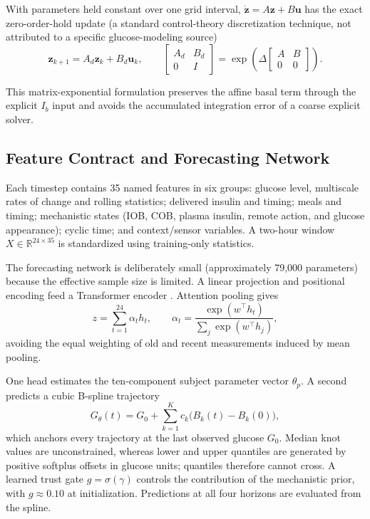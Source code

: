 \documentclass[journal]{IEEEtran}
\begin{document}
With parameters held constant over one grid interval, $\dot{\mathbf{z}} = A\mathbf{z} + B\mathbf{u}$ has the exact zero-order-hold update (a standard control-theory discretization technique, not attributed to a specific glucose-modeling source)
\begin{equation}
\mathbf{z}_{k+1} = A_d \mathbf{z}_k + B_d \mathbf{u}_k, \qquad
\begin{bmatrix} A_d & B_d \\ 0 & I \end{bmatrix} = \exp\!\left(\Delta \begin{bmatrix} A & B \\ 0 & 0 \end{bmatrix}\right).
\label{eq:13}
\end{equation}

This matrix-exponential formulation preserves the affine basal term through the explicit $I_b$ input and avoids the accumulated integration error of a coarse explicit solver.

\subsection{Feature Contract and Forecasting Network}

Each timestep contains 35 named features in six groups: glucose level, multiscale rates of change and rolling statistics; delivered insulin and timing; meals and timing; mechanistic states (IOB, COB, plasma insulin, remote action, and glucose appearance); cyclic time; and context/sensor variables. A two-hour window $X \in \mathbb{R}^{24 \times 35}$ is standardized using training-only statistics.

The forecasting network is deliberately small (approximately 79,000 parameters) because the effective sample size is limited. A linear projection and positional encoding feed a Transformer encoder \cite{ref38}. Attention pooling gives
\begin{equation}
z = \sum_{t=1}^{24} \alpha_t h_t, \qquad \alpha_t = \frac{\exp(w^\top h_t)}{\sum_j \exp(w^\top h_j)},
\label{eq:14}
\end{equation}
avoiding the equal weighting of old and recent measurements induced by mean pooling.

One head estimates the ten-component subject parameter vector $\theta_p$. A second predicts a cubic B-spline trajectory
\begin{equation}
G_\theta(t) = G_0 + \sum_{k=1}^{K} c_k \big(B_k(t) - B_k(0)\big),
\label{eq:15}
\end{equation}
which anchors every trajectory at the last observed glucose $G_0$. Median knot values are unconstrained, whereas lower and upper quantiles are generated by positive softplus offsets in glucose units; quantiles therefore cannot cross. A learned trust gate $g = \sigma(\gamma)$ controls the contribution of the mechanistic prior, with $g \approx 0.10$ at initialization. Predictions at all four horizons are evaluated from the spline.
\end{document}
